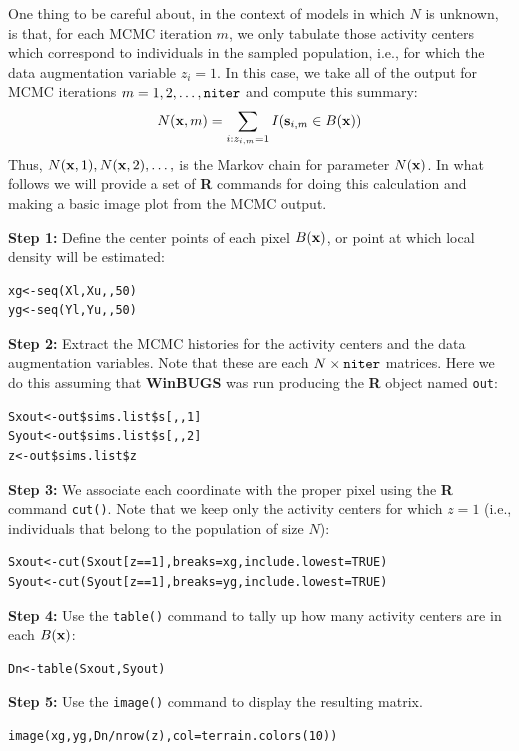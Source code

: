 {One thing to be
careful about, in the context of models in which $N$ is unknown, is
that, for each MCMC iteration $m$, we only tabulate those activity
centers which correspond to individuals in the sampled
population, i.e., for which the data augmentation variable $z_{i} =
1$.  In this case, we take all of the output for MCMC iterations
$m=1,2,\ldots,\mbox{\tt niter}$ and compute this summary:
\[
   N({\bf x},m) = \sum_{i: z_{i,m}=1} I({\bf s}_{i,m} \in B({\bf x}))
\]
Thus, $N({\bf x},1),N({\bf x},2),\dots,$ is the Markov chain for
parameter $N({\bf x})$.  In what follows we will provide a set of {\bf
  R} commands for doing this calculation and making a basic image
plot from the MCMC output.

{\flushleft \bf Step 1:} Define the center points of each pixel $B({\bf
  x})$, or point at which local density will be estimated:
\begin{verbatim}
xg<-seq(Xl,Xu,,50)
yg<-seq(Yl,Yu,,50)
\end{verbatim}

{\flushleft \bf Step 2:} Extract the MCMC histories for the activity
centers and the data augmentation variables.  Note that these are each
$N \times \mbox{\tt niter}$ matrices. Here we do this assuming that
{\bf WinBUGS} was run producing the {\bf R} object named \mbox{\tt out}:
\begin{verbatim}
Sxout<-out$sims.list$s[,,1]
Syout<-out$sims.list$s[,,2]
z<-out$sims.list$z
\end{verbatim}

{\flushleft \bf Step 3:} We associate each coordinate with the proper
pixel using the {\bf R} command \mbox{\tt cut()}. Note that we keep only
the activity centers for which $z=1$ (i.e., individuals that belong to
the population of size $N$):
\begin{verbatim}
Sxout<-cut(Sxout[z==1],breaks=xg,include.lowest=TRUE)
Syout<-cut(Syout[z==1],breaks=yg,include.lowest=TRUE)
\end{verbatim}

{\flushleft \bf Step 4:} Use the \mbox{\tt table()} command to tally
up how many activity centers are in each $B({\bf x})$:
\begin{verbatim}
Dn<-table(Sxout,Syout)
\end{verbatim}

{\flushleft \bf Step 5:} Use the \mbox{\tt image()} command to display
the resulting matrix.
\begin{verbatim}
image(xg,yg,Dn/nrow(z),col=terrain.colors(10))
\end{verbatim}

}
